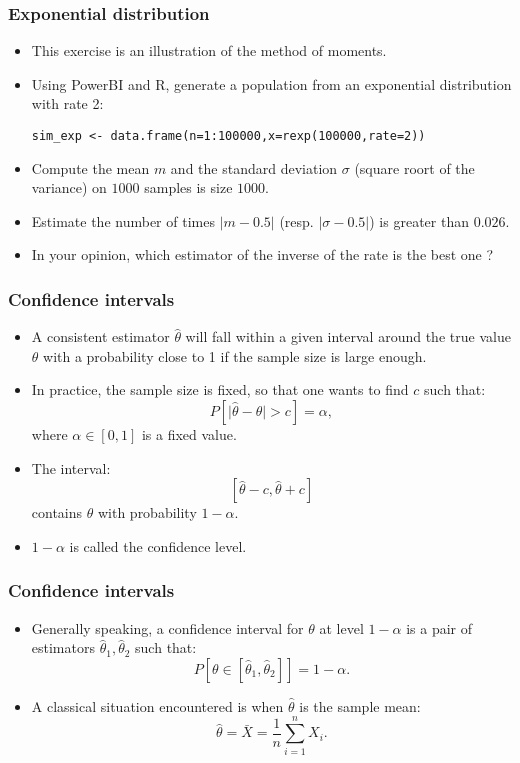 \documentclass[main.tex]{subfiles}
\begin{document}
\begin{frame}[fragile]
    \frametitle{Exponential distribution}
    \begin{itemize}
        \item<+-> This exercise is an illustration of the method of moments.
        \item<+-> Using PowerBI and R, generate a population from an exponential distribution with rate 2:
\begin{verbatim}
sim_exp <- data.frame(n=1:100000,x=rexp(100000,rate=2))
\end{verbatim}
        \item<+-> Compute the mean $m$ and the standard deviation $\sigma$ (square roort of the variance) on $1000$ samples is size $1000$.
        \item<+-> Estimate the number of times $\lvert m - 0.5 \rvert$ (resp. $\lvert \sigma - 0.5 \rvert$) is greater than $0.026.$
        \item<+-> In your opinion, which estimator of the inverse of the rate is the best one ?
    \end{itemize}
\end{frame}

\begin{frame}
    \frametitle{Confidence intervals}
    \begin{itemize}
        \item<+-> A consistent estimator $\hat{\theta}$ will fall within a given interval around the true value $\theta$ with a probability close to 1
        if the sample size is large enough.
        \item<+-> In practice, the sample size is fixed, so that one wants to find $c$ such that:
        \begin{equation}
            P\left[ \lvert \hat{\theta} - \theta \rvert > c \right] = \alpha,
        \end{equation}
        where $\alpha \in [0,1]$ is a fixed value.
        \item<+-> The interval:
        \[
        \left[ \hat{\theta}-c, \hat{\theta} + c \right]
        \]
        contains $\theta$ with probability $1- \alpha.$
        \item<+-> $1-\alpha$ is called the confidence level.
    \end{itemize}
\end{frame}

\begin{frame}
    \frametitle{Confidence intervals}
    \begin{itemize}
        \item<+-> Generally speaking, a confidence interval for $\theta$ at level $1-\alpha$ is a pair of estimators $\hat{\theta}_1, \hat{\theta}_2$ 
        such that:
        \[
        P\left[\theta \in  \left[ \hat{\theta}_1, \hat{\theta}_2\right] \right] = 1-\alpha.
        \]
        \item<+-> A classical situation encountered is when $\hat{\theta}$ is the sample mean:
        \[
        \hat{\theta} = \bar{X} = \frac{1}{n} \sum_{i=1}^n X_i.
        \]
    \end{itemize}
\end{frame}
\end{document}
